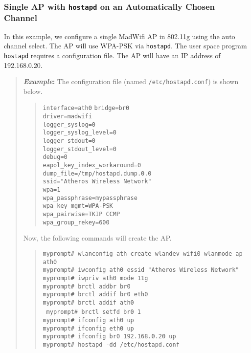 \documentclass[10pt,fullpage]{article}
\newcommand{\mytt}[1]{{\texttt{#1}}}
\newcommand{\bv}{\begin{verse}}
\newcommand{\ev}{\end{verse}}
\newcommand{\cmd}[1]{{\texttt{myprompt\# #1}}}
\newenvironment{example}{\begin{quote}\textbf{\textit{Example}:}}{\end{quote}}
\begin{document}
\subsubsection{Single AP with \mytt{hostapd} on an Automatically Chosen
  Channel}
In this example, we configure a single MadWifi AP in 802.11g using the
auto channel select.  The AP will use WPA-PSK via \mytt{hostapd}.
The user space program \mytt{hostapd} requires a configuration
file.  The AP will have an IP address of 192.168.0.20.

\begin{example}
  The configuration file (named \mytt{/etc/hostapd.conf}) is shown
  below.
  \bv
  \mytt{interface=ath0}
  \mytt{bridge=br0}\\
  \mytt{driver=madwifi}\\
  \mytt{logger\_syslog=0}\\
  \mytt{logger\_syslog\_level=0}\\
  \mytt{logger\_stdout=0}\\
  \mytt{logger\_stdout\_level=0}\\
  \mytt{debug=0}\\
  \mytt{eapol\_key\_index\_workaround=0}\\
  \mytt{dump\_file=/tmp/hostapd.dump.0.0}\\
  \mytt{ssid="Atheros Wireless Network"}\\
  \mytt{wpa=1}\\
  \mytt{wpa\_passphrase=mypassphrase}\\
  \mytt{wpa\_key\_mgmt=WPA-PSK}\\
  \mytt{wpa\_pairwise=TKIP CCMP}\\
  \mytt{wpa\_group\_rekey=600}
  \ev
  Now, the following commands will create the AP.
  \bv
  \cmd{wlanconfig ath create wlandev wifi0 wlanmode ap}\\
  \mytt{ath0}\\
  \cmd{iwconfig ath0 essid "Atheros Wireless Network"}\\
  \cmd{iwpriv ath0 mode 11g}\\
  \cmd{brctl addbr br0}\\
  \cmd{brctl addif br0 eth0}\\
  \cmd{brctl addif ath0}\\\
  \cmd{brctl setfd br0 1}\\
  \cmd{ifconfig ath0 up}\\
  \cmd{ifconfig eth0 up}\\
  \cmd{ifconfig br0 192.168.0.20 up}\\
  \cmd{hostapd -dd /etc/hostapd.conf}
  \ev
\end{example}
\end{document}
